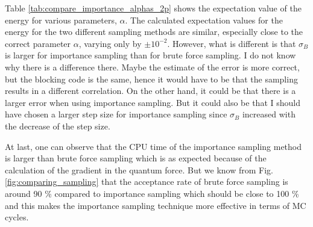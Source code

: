 Table \ref{tab:compare_importance_alphas_2p} shows the expectation value of the energy for various parameters, $\alpha$.  The calculated expectation values for the energy for the two different sampling methods are similar, especially close to the correct parameter $\alpha$, varying only by $\pm 10^{-2}$. However, what is different is that $\sigma_B$ is larger for importance sampling than for brute force sampling. I do not know why there is a difference there. Maybe the estimate of the error is more correct, but the blocking code is the same, hence it would have to be that the sampling results in a different correlation. On the other hand, it could be that there is a larger error when using importance sampling. But it could also be that I should have chosen a larger step size for importance sampling since $\sigma_B$ increased with the decrease of the step size. 

At last, one can observe that the CPU time of the importance sampling method is larger than brute force sampling which is as expected because of the calculation of the gradient in the quantum force. But we know from Fig. \ref{fig:comparing_sampling} that the acceptance rate of brute force sampling is around 90 \% compared to importance sampling which should be close to 100 \% and this makes the importance sampling technique more effective in terms of MC cycles.

